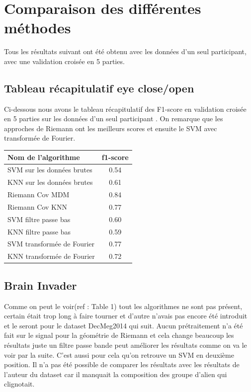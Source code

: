 \documentclass{article}[12pt]
\begin{document}
\section{Comparaison des différentes méthodes}
Tous les résultats suivant ont été obtenu avec les données d'un seul participant, avec une validation croisée en 5 parties.
\subsection{Tableau récapitulatif eye close/open}
Ci-dessous nous avons le tableau récapitulatif des F1-score en validation croisée en 5 parties sur les données d'un seul participant . On remarque que les approches de Riemann ont les meilleurs scores et ensuite le SVM avec transformée de Fourier.\\
\begin{center}
\begin{tabular}{|l|c|}
  \hline
  Nom de l'algorithme & f1-score\\
  \hline
  SVM sur les données brutes & 0.54 \\
  KNN sur les données brutes & 0.61\\
  Riemann Cov MDM  & 0.84 \\
  Riemann Cov KNN & 0.77\\
  SVM filtre passe bas & 0.60 \\
  KNN filtre passe bas & 0.59 \\
  SVM transformée de Fourier & 0.77 \\
  KNN transformée de Fourier & 0.72 \\
  \hline
\end{tabular}
\end{center}
\subsection{Brain Invader}
Comme on peut le voir(ref : Table 1) tout les algorithmes ne sont pas présent, certain était trop long à faire tourner et d'autre n'avais pas encore été introduit et le seront pour le dataset DecMeg2014 qui suit. Aucun prétraitement n'a été fait sur le signal pour la géométrie de Riemann et cela change beaucoup les résultats juste un filtre passe bande peut améliorer les résultats comme on va le voir par la suite. C'est aussi pour cela qu'on retrouve un SVM en deuxième position. Il n'a pas été possible de comparer les résultats avec les résultats de l'auteur du dataset car il manquait la composition des groupe d'alien qui clignotait.\\
\end{document}

